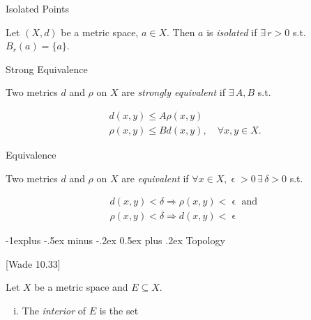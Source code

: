 \documentclass[10pt]{article} %
\makeatletter
\newcommand{\cw}[1]{[Wade #1]}
\renewcommand{\leq}{\leqslant}
\renewcommand{\subsection}{\@startsection{subsection}{2}{0mm}%
                                {-1explus -.5ex minus -.2ex}%
                                {0.5ex plus .2ex}%
                                {\normalfont\normalsize\bfseries}}
\makeatother
\begin{document}
\begin{multicols}{3}
\begin{definition}{}{Isolated Points}

    Let $(X,d)$ be a metric space, $a \in X$. Then $a$ is \emph{isolated} if $\exists \, r > 0$ s.t. $B_r(a) = \{a\}$.

\end{definition}

\begin{definition}{}{Strong Equivalence}

    Two metrics $d$ and $\rho$ on $X$ are \emph{strongly equivalent} if $\exists \, A,B$ s.t.

        \begin{align*}
            &d(x,y) \leq A \rho(x,y) \\
            &\rho(x,y) \leq B d(x,y), \quad \forall x,y \in X.
        \end{align*}

\end{definition}

\begin{definition}{}{Equivalence}

    Two metrics $d$ and $\rho$ on $X$ are \emph{equivalent} if $\forall x \in X, \upvarepsilon > 0 \, \exists \, \delta > 0$ s.t.

        \begin{align*}
            &d(x,y) < \delta \Rightarrow \rho(x,y) < \upvarepsilon \textrm{ and } \\
            &\rho(x,y) < \delta \Rightarrow d(x,y) < \upvarepsilon
        \end{align*}

\end{definition}


\subsection{Topology}

\begin{definition}{\cw{10.33}}{}

    Let $X$ be a metric space and $E \subseteq X$.

        \begin{enumerate}[i)]
            \setlength{\parskip}{0em}
            \item The \emph{interior} of $E$ is the set


\end{enumerate}
\end{definition}
\end{multicols}
\end{document}
